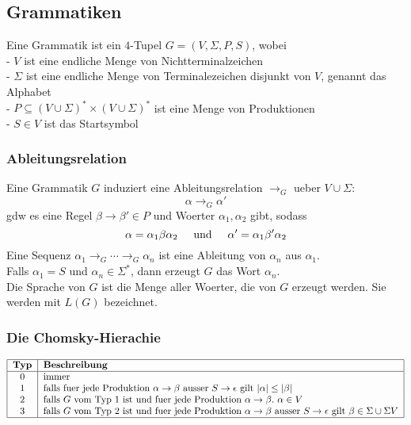 \documentclass[paper=a4, fontsize=11pt]{scrartcl} %
\numberwithin{equation}{section} %
\numberwithin{figure}{section} %
\numberwithin{table}{section} %
\begin{document}
\subsection{Grammatiken}

Eine Grammatik ist ein $4$-Tupel $G=(V,\Sigma,P,S)$, wobei\\

- $V$ ist eine endliche Menge von Nichtterminalzeichen\\
- $\Sigma$ ist eine endliche Menge von Terminalezeichen disjunkt von $V$, genannt das Alphabet\\
- $P\subseteq(V\cup\Sigma)^*\times(V\cup\Sigma)^*$ ist eine Menge von Produktionen\\
- $S\in V$ ist das Startsymbol

\subsubsection{Ableitungsrelation}

Eine Grammatik $G$ induziert eine Ableitungsrelation $\rightarrow_G$ ueber $V\cup\Sigma:$
$$\alpha\rightarrow_G\alpha'$$
gdw es eine Regel $\beta\rightarrow\beta'\in P$ und Woerter $\alpha_1,\alpha_2$ gibt, sodass
$$\alpha=\alpha_1\beta\alpha_2\hspace{0.5cm}\text{und}\hspace{0.5cm}\alpha'=\alpha_1\beta'\alpha_2$$
Eine Sequenz $\alpha_1\rightarrow_G\cdots\rightarrow_G\alpha_n$ ist eine Ableitung von $\alpha_n$ aus $\alpha_1$.\\
Falls $\alpha_1=S$ und $\alpha_n\in\Sigma^*$, dann erzeugt $G$ das Wort $\alpha_n$.\\
Die Sprache von $G$ ist die Menge aller Woerter, die von $G$ erzeugt werden. Sie werden mit $L(G)$ bezeichnet.

\subsubsection{Die Chomsky-Hierachie}

\[
\begin{tabular}{|c|l|}
\hline
\textbf{Typ} & \textbf{Beschreibung} \\
\hline
0 & immer \\
1 & falls fuer jede Produktion $\alpha\rightarrow\beta$ ausser $S\rightarrow\epsilon$ gilt $|\alpha|\leq|\beta|$ \\
2 & falls $G$ vom Typ 1 ist und fuer jede Produktion $\alpha\rightarrow\beta.\ \alpha\in V$ \\
3 & falls $G$ vom Typ 2 ist und fuer jede Produktion $\alpha\rightarrow\beta$ ausser $S\rightarrow\epsilon$ gilt $\beta\in\Sigma\cup\Sigma V$ \\
\hline
\end{tabular}
\]\\
\end{document}
